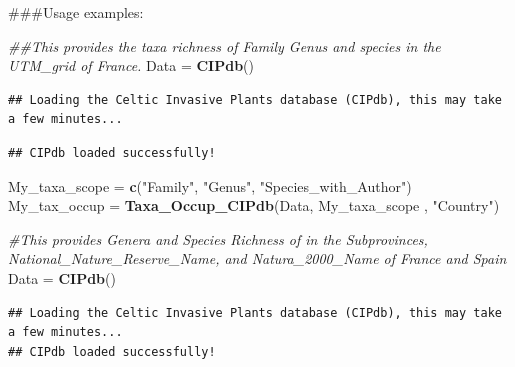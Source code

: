 \documentclass[
]{article}
\newenvironment{Shaded}{\begin{snugshade}}{\end{snugshade}}
\newcommand{\CommentTok}[1]{\textcolor[rgb]{0.56,0.35,0.01}{\textit{#1}}}
\newcommand{\FunctionTok}[1]{\textcolor[rgb]{0.13,0.29,0.53}{\textbf{#1}}}
\newcommand{\NormalTok}[1]{#1}
\newcommand{\OtherTok}[1]{\textcolor[rgb]{0.56,0.35,0.01}{#1}}
\newcommand{\StringTok}[1]{\textcolor[rgb]{0.31,0.60,0.02}{#1}}
\begin{document}
\#\#\#Usage examples:

\begin{Shaded}
\begin{Highlighting}[]
\CommentTok{\#\textquotesingle{}\#This provides the taxa richness of Family Genus and species in the UTM\_grid of France.}
\NormalTok{Data }\OtherTok{=} \FunctionTok{CIPdb}\NormalTok{()}
\end{Highlighting}
\end{Shaded}

\begin{verbatim}
## Loading the Celtic Invasive Plants database (CIPdb), this may take a few minutes...
\end{verbatim}

\begin{verbatim}
## CIPdb loaded successfully!
\end{verbatim}

\begin{Shaded}
\begin{Highlighting}[]
\NormalTok{My\_taxa\_scope }\OtherTok{=} \FunctionTok{c}\NormalTok{(}\StringTok{"Family"}\NormalTok{, }\StringTok{"Genus"}\NormalTok{, }\StringTok{"Species\_with\_Author"}\NormalTok{)}
\NormalTok{My\_tax\_occup }\OtherTok{=} \FunctionTok{Taxa\_Occup\_CIPdb}\NormalTok{(Data, My\_taxa\_scope , }\StringTok{"Country"}\NormalTok{)}

\CommentTok{\#This provides Genera and Species Richness of  in the Subprovinces, National\_Nature\_Reserve\_Name, and Natura\_2000\_Name  of France  and Spain}
\NormalTok{Data }\OtherTok{=} \FunctionTok{CIPdb}\NormalTok{()}
\end{Highlighting}
\end{Shaded}

\begin{verbatim}
## Loading the Celtic Invasive Plants database (CIPdb), this may take a few minutes...
## CIPdb loaded successfully!
\end{verbatim}
\end{document}
